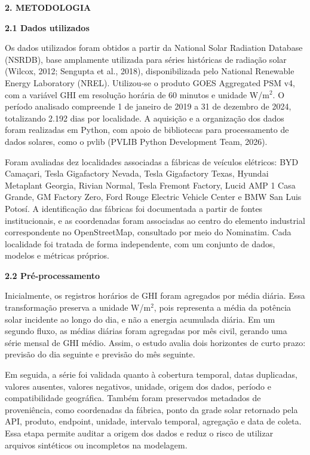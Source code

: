 \documentclass[12pt,a4paper]{article}
\begin{document}
\vspace{12pt}

\noindent\textbf{2. METODOLOGIA}

\vspace{12pt}

\noindent\textbf{2.1 Dados utilizados}

Os dados utilizados foram obtidos a partir da National Solar Radiation Database (NSRDB), base amplamente utilizada para séries históricas de radiação solar (Wilcox, 2012; Sengupta et al., 2018), disponibilizada pelo National Renewable Energy Laboratory (NREL). Utilizou-se o produto GOES Aggregated PSM v4, com a variável GHI em resolução horária de 60 minutos e unidade W/m$^2$. O período analisado compreende 1 de janeiro de 2019 a 31 de dezembro de 2024, totalizando 2.192 dias por localidade. A aquisição e a organização dos dados foram realizadas em Python, com apoio de bibliotecas para processamento de dados solares, como o pvlib (PVLIB Python Development Team, 2026).

Foram avaliadas dez localidades associadas a fábricas de veículos elétricos: BYD Camaçari, Tesla Gigafactory Nevada, Tesla Gigafactory Texas, Hyundai Metaplant Georgia, Rivian Normal, Tesla Fremont Factory, Lucid AMP 1 Casa Grande, GM Factory Zero, Ford Rouge Electric Vehicle Center e BMW San Luis Potosí. A identificação das fábricas foi documentada a partir de fontes institucionais, e as coordenadas foram associadas ao centro do elemento industrial correspondente no OpenStreetMap, consultado por meio do Nominatim. Cada localidade foi tratada de forma independente, com um conjunto de dados, modelos e métricas próprios.

\vspace{12pt}

\noindent\textbf{2.2 Pré-processamento}

Inicialmente, os registros horários de GHI foram agregados por média diária. Essa transformação preserva a unidade W/m$^2$, pois representa a média da potência solar incidente ao longo do dia, e não a energia acumulada diária. Em um segundo fluxo, as médias diárias foram agregadas por mês civil, gerando uma série mensal de GHI médio. Assim, o estudo avalia dois horizontes de curto prazo: previsão do dia seguinte e previsão do mês seguinte.

Em seguida, a série foi validada quanto à cobertura temporal, datas duplicadas, valores ausentes, valores negativos, unidade, origem dos dados, período e compatibilidade geográfica. Também foram preservados metadados de proveniência, como coordenadas da fábrica, ponto da grade solar retornado pela API, produto, endpoint, unidade, intervalo temporal, agregação e data de coleta. Essa etapa permite auditar a origem dos dados e reduz o risco de utilizar arquivos sintéticos ou incompletos na modelagem.
\end{document}
